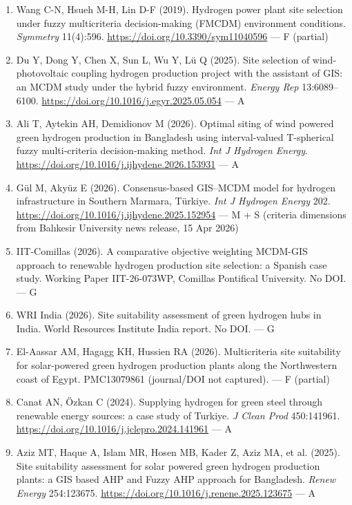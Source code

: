 \documentclass[11pt,a4paper]{article}
\begin{document}
\begin{enumerate}
  \item Wang C-N, Hsueh M-H, Lin D-F (2019). Hydrogen power plant site selection under fuzzy multicriteria decision-making (FMCDM) environment conditions. \textit{Symmetry} 11(4):596. \url{https://doi.org/10.3390/sym11040596} --- F (partial)

  \item Du Y, Dong Y, Chen X, Sun L, Wu Y, Lü Q (2025). Site selection of wind-photovoltaic coupling hydrogen production project with the assistant of GIS: an MCDM study under the hybrid fuzzy environment. \textit{Energy Rep} 13:6089--6100. \url{https://doi.org/10.1016/j.egyr.2025.05.054} --- A

  \item Ali T, Aytekin AH, Demidionov M (2026). Optimal siting of wind powered green hydrogen production in Bangladesh using interval-valued T-spherical fuzzy multi-criteria decision-making method. \textit{Int J Hydrogen Energy}. \url{https://doi.org/10.1016/j.ijhydene.2026.153931} --- A

  \item Gül M, Akyüz E (2026). Consensus-based GIS--MCDM model for hydrogen infrastructure in Southern Marmara, Türkiye. \textit{Int J Hydrogen Energy} 202. \url{https://doi.org/10.1016/j.ijhydene.2025.152954} --- M + S (criteria dimensions from Balıkesir University news release, 15 Apr 2026)

  \item IIT-Comillas (2026). A comparative objective weighting MCDM-GIS approach to renewable hydrogen production site selection: a Spanish case study. Working Paper IIT-26-073WP, Comillas Pontifical University. No DOI. --- G

  \item WRI India (2026). Site suitability assessment of green hydrogen hubs in India. World Resources Institute India report. No DOI. --- G

  \item El-Aassar AM, Hagagg KH, Hussien RA (2026). Multicriteria site suitability for solar-powered green hydrogen production plants along the Northwestern coast of Egypt. PMC13079861 (journal/DOI not captured). --- F (partial)

  \item Canat AN, Özkan C (2024). Supplying hydrogen for green steel through renewable energy sources: a case study of Turkiye. \textit{J Clean Prod} 450:141961. \url{https://doi.org/10.1016/j.jclepro.2024.141961} --- A

  \item Aziz MT, Haque A, Islam MR, Hosen MB, Kader Z, Aziz MA, et al. (2025). Site suitability assessment for solar powered green hydrogen production plants: a GIS based AHP and Fuzzy AHP approach for Bangladesh. \textit{Renew Energy} 254:123675. \url{https://doi.org/10.1016/j.renene.2025.123675} --- A


\end{enumerate}
\end{document}
